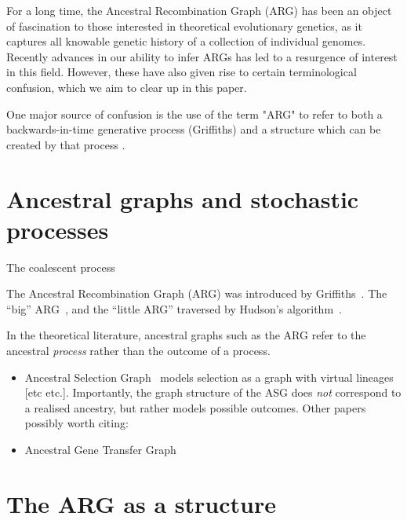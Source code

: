 \documentclass{article}
\begin{document}
For a long time, the Ancestral Recombination Graph (ARG) has been an object of
fascination to those interested in theoretical evolutionary genetics, as it
captures all knowable genetic history of a collection of individual genomes.
Recently advances in our ability to infer ARGs has led to a resurgence of
interest in this field. However, these have also given rise to certain
terminological confusion, which we aim to clear up in this paper.

One major source of confusion is the use of the term "ARG" to refer to both a
backwards-in-time generative process (Griffiths) and a structure which can be
created by that process
\citep[e.g.][]{minichiello2006mapping,mathieson2020ancestry}.

\section*{Ancestral graphs and stochastic processes}


The coalescent
process~\citep{kingman1982coalescent,kingman1982genealogy,hudson1983testing,
tajima1983evolutionary}

The Ancestral Recombination Graph (ARG) was introduced by
Griffiths~\citep{griffiths1991two,griffiths1997ancestral}.
The ``big'' ARG~\citep{ethier1990two},
and the ``little ARG'' traversed by
Hudson's algorithm~\citep{hudson1983properties}.


In the theoretical literature, ancestral graphs such as the ARG refer to the
ancestral \emph{process} rather than the outcome of a process.
\begin{itemize}
\item Ancestral Selection
Graph~\citep{krone1997ancestral,neuhauser1999ancestral} models selection
as a graph with virtual lineages [etc etc.]. Importantly, the graph structure
of the ASG does \emph{not} correspond to a realised ancestry, but rather
models possible outcomes.
Other papers possibly worth citing:\citep{etheridge2009coalescent}
\item Ancestral Gene Transfer Graph~\citep{baumdicker2014infinitely}
\end{itemize}

\section*{The ARG as a structure}
\end{document}
